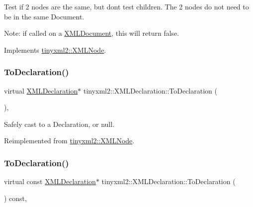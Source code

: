 Test if 2 nodes are the same, but don\textquotesingle{}t test children. The 2 nodes do not need to be in the same Document.

Note\+: if called on a \mbox{\hyperlink{classtinyxml2_1_1_x_m_l_document}{X\+M\+L\+Document}}, this will return false. 

Implements \mbox{\hyperlink{classtinyxml2_1_1_x_m_l_node_a7ce18b751c3ea09eac292dca264f9226}{tinyxml2\+::\+X\+M\+L\+Node}}.

\mbox{\label{classtinyxml2_1_1_x_m_l_declaration_a159d8ac45865215e88059ea1e5b52fc5}} 
\subsubsection{\texorpdfstring{To\+Declaration()}{ToDeclaration()}\hspace{0.1cm}{\footnotesize\ttfamily [1/2]}}
{\footnotesize\ttfamily virtual \mbox{\hyperlink{classtinyxml2_1_1_x_m_l_declaration}{X\+M\+L\+Declaration}}$\ast$ tinyxml2\+::\+X\+M\+L\+Declaration\+::\+To\+Declaration (\begin{DoxyParamCaption}{ }\end{DoxyParamCaption})\hspace{0.3cm}{\ttfamily [inline]}, {\ttfamily [virtual]}}



Safely cast to a Declaration, or null. 



Reimplemented from \mbox{\hyperlink{classtinyxml2_1_1_x_m_l_node_a174fd4c22c010b58138c1b84a0dfbd51}{tinyxml2\+::\+X\+M\+L\+Node}}.

\mbox{\label{classtinyxml2_1_1_x_m_l_declaration_aa20c3315b18c3b88830dccf5c493259b}} 
\subsubsection{\texorpdfstring{To\+Declaration()}{ToDeclaration()}\hspace{0.1cm}{\footnotesize\ttfamily [2/2]}}
{\footnotesize\ttfamily virtual const \mbox{\hyperlink{classtinyxml2_1_1_x_m_l_declaration}{X\+M\+L\+Declaration}}$\ast$ tinyxml2\+::\+X\+M\+L\+Declaration\+::\+To\+Declaration (\begin{DoxyParamCaption}{ }\end{DoxyParamCaption}) const\hspace{0.3cm}{\ttfamily [inline]}, {\ttfamily [virtual]}}



